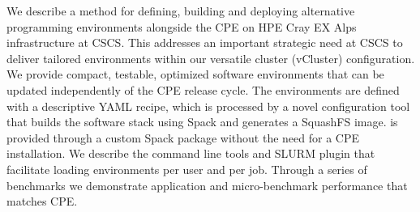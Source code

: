 We describe a method for defining, building and deploying alternative programming environments alongside the CPE on HPE Cray EX Alps infrastructure at CSCS.
This addresses an important strategic need at CSCS to deliver tailored environments within our versatile cluster (vCluster) configuration.
We provide compact, testable, optimized software environments that can be updated independently of the CPE release cycle.
The environments are defined with a descriptive YAML recipe, which is processed by a novel configuration tool that builds the software stack using Spack and generates a SquashFS image.
\craympich is provided through a custom Spack package without the need for a CPE installation.
We describe the command line tools and SLURM plugin that facilitate loading environments per user and per job.
Through a series of benchmarks we demonstrate application and micro-benchmark performance that matches CPE.

